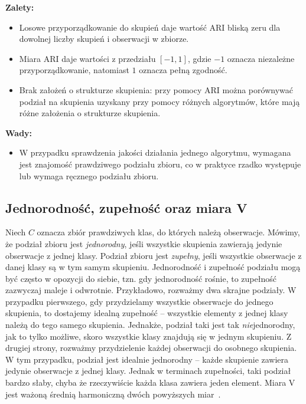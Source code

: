 \documentclass{praca1}
\begin{document}
\textbf{Zalety:}
\begin{itemize}
\item Losowe przyporządkowanie do skupień daje wartość $\textrm{ARI}$ bliską zeru dla dowolnej liczby skupień i obserwacji w zbiorze.
\item Miara $\textrm{ARI}$ daje wartości z przedziału $[-1, 1]$, gdzie $-1$ oznacza niezależne przyporządkowanie, natomiast $1$ oznacza pełną zgodność.
\item Brak założeń o strukturze skupienia: przy pomocy $\textrm{ARI}$ można porównywać podział na skupienia uzyskany przy pomocy różnych algorytmów, które mają różne założenia o strukturze skupienia.
\end{itemize}

\textbf{Wady:}
\begin{itemize}
\item W przypadku sprawdzenia jakości działania jednego algorytmu, wymagana jest znajomość prawdziwego podziału zbioru, co w praktyce rzadko występuje lub wymaga ręcznego podziału zbioru.
\end{itemize}

\subsection{Jednorodność, zupełność oraz miara V}

Niech $C$ oznacza zbiór prawdziwych klas, do których należą obserwacje. Mówimy, że podział zbioru jest \emph{jednorodny}, jeśli wszystkie skupienia zawierają jedynie obserwacje z jednej klasy. Podział zbioru jest \emph{zupełny}, jeśli wszystkie obserwacje z danej klasy są w tym samym skupieniu. Jednorodność i zupełność podziału mogą być często w opozycji do siebie, tzn. gdy jednorodność rośnie, to zupełność zazwyczaj maleje i odwrotnie. Przykładowo, rozważmy dwa skrajne podziały. W przypadku pierwszego, gdy przydzielamy wszystkie obserwacje do jednego skupienia, to dostajemy idealną zupełność -- wszystkie elementy z jednej klasy należą do tego samego skupienia. Jednakże, podział taki jest tak \emph{nie}jednorodny, jak to tylko możliwe, skoro wszystkie klasy znajdują się w jednym skupieniu. Z drugiej strony, rozważmy przydzielenie każdej obserwacji do osobnego skupienia. W tym przypadku, podział jest idealnie jednorodny -- każde skupienie zawiera jedynie obserwacje z jednej klasy. Jednak w terminach zupełności, taki podział bardzo słaby, chyba że rzeczywiście każda klasa zawiera jeden element. Miara $\textrm{V}$ jest ważoną średnią harmoniczną dwóch powyższych miar~\cite{Rosenberg2007:vmeasure}.
\end{document}
